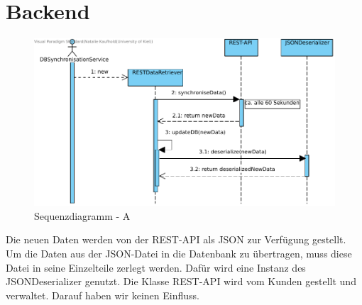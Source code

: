 


\section{Backend}

\begin{figure}[h]
	\centering
	\includegraphics[width=16cm]{img/diagrams/RESThandling.pdf}	
	\caption{Sequenzdiagramm - A}
	\label{fig:sequenz-a}
\end{figure}

Die neuen Daten werden von der REST-API als JSON zur Verfügung gestellt. Um die Daten aus der JSON-Datei in die Datenbank zu übertragen, muss  diese Datei in seine Einzelteile zerlegt werden. Dafür wird eine Instanz des JSONDeserializer genutzt.
Die Klasse REST-API wird vom Kunden gestellt und verwaltet. Darauf haben wir keinen Einfluss.
